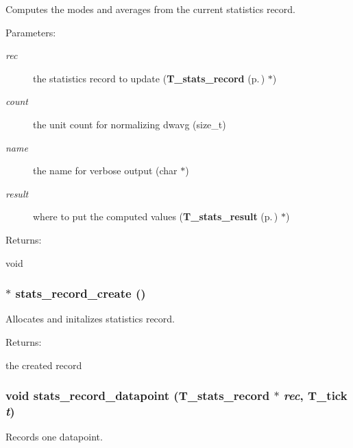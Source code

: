 Computes the modes and averages from the current statistics record.

\begin{Desc}
\item[Parameters: ]\par
\begin{description}
\item[{\em 
rec}]the statistics record to update ({\bf T\_\-stats\_\-record} {\rm (p.\,\pageref{structT__stats__record})} $\ast$) \item[{\em 
count}]the unit count for normalizing dwavg (size\_\-t) \item[{\em 
name}]the name for verbose output (char $\ast$) \item[{\em 
result}]where to put the computed values ({\bf T\_\-stats\_\-result} {\rm (p.\,\pageref{structT__stats__result})} $\ast$) \end{description}
\end{Desc}
\begin{Desc}
\item[Returns: ]\par
void \end{Desc}
\subsubsection{$\ast$ stats\_\-record\_\-create ()}\label{group__stats_a2}


Allocates and initalizes statistics record.

\begin{Desc}
\item[Returns: ]\par
the created record \end{Desc}
\subsubsection{\setlength{\rightskip}{0pt plus 5cm}void stats\_\-record\_\-datapoint ({\bf T\_\-stats\_\-record} $\ast$ {\em rec}, {\bf T\_\-tick} {\em t})}\label{group__stats_a3}


Records one datapoint.

